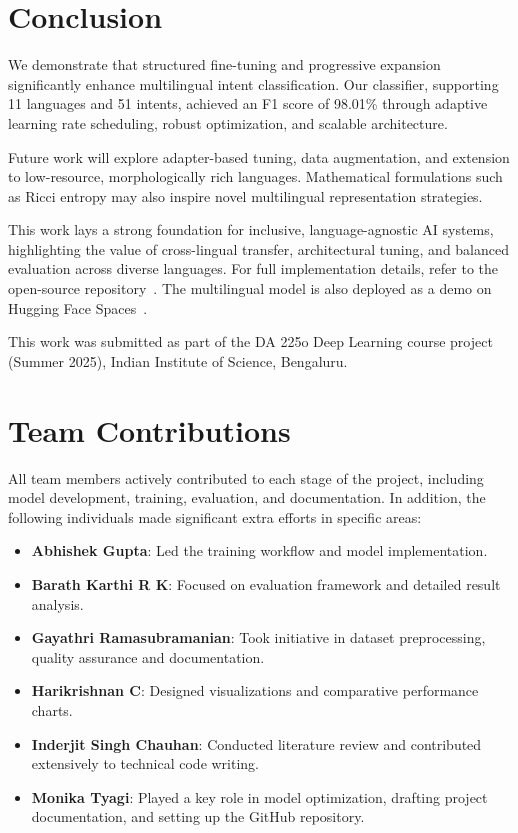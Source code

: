 \documentclass{ecai}
\begin{document}
\section{Conclusion}
We demonstrate that structured fine-tuning and progressive expansion significantly enhance multilingual intent classification. Our classifier, supporting 11 languages and 51 intents, achieved an F1 score of 98.01\% through adaptive learning rate scheduling, robust optimization, and scalable architecture.

Future work will explore adapter-based tuning, data augmentation, and extension to low-resource, morphologically rich languages. Mathematical formulations such as Ricci entropy \cite{perelman2002entropy} may also inspire novel multilingual representation strategies.

This work lays a strong foundation for inclusive, language-agnostic AI systems, highlighting the value of cross-lingual transfer, architectural tuning, and balanced evaluation across diverse languages. For full implementation details, refer to the open-source repository~\cite{deepdatasquad2025}. The multilingual model is also deployed as a demo on Hugging Face Spaces~\cite{intentbert_demo2025}.


\begin{ack}
This work was submitted as part of the DA 225o Deep Learning course project (Summer 2025), Indian Institute of Science, Bengaluru.
\end{ack}




\newpage
\section*{Team Contributions}
All team members actively contributed to each stage of the project, including model development, training, evaluation, and documentation. In addition, the following individuals made significant extra efforts in specific areas:

\begin{itemize}
    \item \textbf{Abhishek Gupta}: Led the training workflow and model implementation.
    \item \textbf{Barath Karthi R K}: Focused on evaluation framework and detailed result analysis.
    \item \textbf{Gayathri Ramasubramanian}: Took initiative in dataset preprocessing, quality assurance and documentation.
    \item \textbf{Harikrishnan C}: Designed visualizations and comparative performance charts.
    \item \textbf{Inderjit Singh Chauhan}: Conducted literature review and contributed extensively to technical code writing.
    \item \textbf{Monika Tyagi}: Played a key role in model optimization, drafting project documentation, and setting up the GitHub repository.
\end{itemize}
\end{document}
